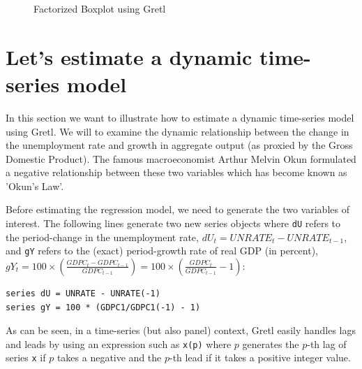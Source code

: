 \documentclass[11pt]{article}
\begin{document}
\begin{figure}[h!]
	\centering
	\caption{Factorized Boxplot using Gretl}
	\label{fig:Plot2}
\end{figure}



\section{Let's estimate a dynamic time-series model}
In this section we want to illustrate how to estimate a dynamic time-series model using Gretl. We will to examine the dynamic relationship between the change in the unemployment rate and growth in aggregate output (as proxied by the Gross Domestic Product). The famous macroeconomist Arthur Melvin Okun formulated a negative relationship between these two variables which has become known as 'Okun's Law'.

Before estimating the regression model, we need to generate the two variables of interest. The following lines generate two new series objects where \texttt{dU} refers to the period-change in the unemployment rate, $ dU_t = UNRATE_t - UNRATE_{t-1} $, and \texttt{gY} refers to the (exact) period-growth rate of real GDP (in percent), $ gY_t =  100 \times \left( \frac{GDPC_t - GDPC_{t-1}}{GDPC_{t-1}}\right) = 100 \times \left( \frac{GDPC_t}{GDPC_{t-1}}-1 \right)$:
\begin{Verbatim}[baselinestretch=0.75, fontsize=\small]
series dU = UNRATE - UNRATE(-1)
series gY = 100 * (GDPC1/GDPC1(-1) - 1)
\end{Verbatim}
As can be seen, in a time-series (but also panel) context, Gretl easily handles lags and leads by using an expression such as \texttt{x(p)} where $ p $ generates the $ p $-th lag of series \texttt{x} if $p$  takes a negative and the $ p $-th lead if it takes a positive integer value.
\end{document}
